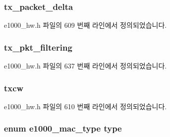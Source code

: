 \subsubsection[{\texorpdfstring{tx\+\_\+packet\+\_\+delta}{tx_packet_delta}}]{ tx\+\_\+packet\+\_\+delta}\hypertarget{structe1000__mac__info_a531f2ab9bdd4116ada55635db66ec96a}{}\label{structe1000__mac__info_a531f2ab9bdd4116ada55635db66ec96a}


e1000\+\_\+hw.\+h 파일의 609 번째 라인에서 정의되었습니다.

\subsubsection[{\texorpdfstring{tx\+\_\+pkt\+\_\+filtering}{tx_pkt_filtering}}]{ tx\+\_\+pkt\+\_\+filtering}\hypertarget{structe1000__mac__info_a90cde7eebf02da4f2821febabc1452ad}{}\label{structe1000__mac__info_a90cde7eebf02da4f2821febabc1452ad}


e1000\+\_\+hw.\+h 파일의 637 번째 라인에서 정의되었습니다.

\subsubsection[{\texorpdfstring{txcw}{txcw}}]{ txcw}\hypertarget{structe1000__mac__info_a01b2269920926d709a20857cffc1bf99}{}\label{structe1000__mac__info_a01b2269920926d709a20857cffc1bf99}


e1000\+\_\+hw.\+h 파일의 610 번째 라인에서 정의되었습니다.

\subsubsection[{\texorpdfstring{type}{type}}]{\setlength{\rightskip}{0pt plus 5cm}enum {\bf e1000\+\_\+mac\+\_\+type} type}\hypertarget{structe1000__mac__info_aa278e9fd67ac539e410e444a48db5455}{}\label{structe1000__mac__info_aa278e9fd67ac539e410e444a48db5455}


